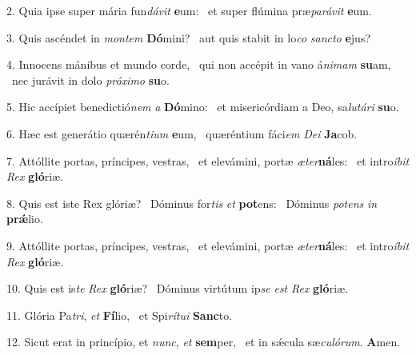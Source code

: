 2. Quia ipse super mária fun\textit{dá}\textit{vit} \textbf{e}um: \ast\  et super flúmina præ\textit{pa}\textit{rá}\textit{vit} \textbf{e}um.\

3. Quis ascéndet in \textit{mon}\textit{tem} \textbf{Dó}mini? \ast\  aut quis stabit in lo\textit{co} \textit{sanc}\textit{to} \textbf{e}jus?\

4. Innocens mánibus et mundo corde, \dag\  qui non accépit in vano á\textit{ni}\textit{mam} \textbf{su}am, \ast\  nec jurávit in dolo \textit{pró}\textit{xi}\textit{mo} \textbf{su}o.\

5. Hic accípiet benedictió\textit{nem} \textit{a} \textbf{Dó}mino: \ast\  et misericórdiam a Deo, sa\textit{lu}\textit{tá}\textit{ri} \textbf{su}o.\

6. Hæc est generátio quærén\textit{ti}\textit{um} \textbf{e}um, \ast\  quæréntium fáci\textit{em} \textit{De}\textit{i} \textbf{Ja}cob.\

7. Attóllite portas, príncipes, vestras, \dag\  et elevámini, portæ \textit{æ}\textit{ter}\textbf{ná}les: \ast\  et intro\textit{í}\textit{bit} \textit{Rex} \textbf{gló}riæ.\

8. Quis est iste Rex glóriæ? \dag\  Dóminus for\textit{tis} \textit{et} \textbf{pot}ens: \ast\  Dóminus \textit{pot}\textit{ens} \textit{in} \textbf{prǽ}lio.\

9. Attóllite portas, príncipes, vestras, \dag\  et elevámini, portæ \textit{æ}\textit{ter}\textbf{ná}les: \ast\  et intro\textit{í}\textit{bit} \textit{Rex} \textbf{gló}riæ.\

10. Quis est is\textit{te} \textit{Rex} \textbf{gló}riæ? \ast\  Dóminus virtútum ip\textit{se} \textit{est} \textit{Rex} \textbf{gló}riæ.\

11. Glória Pa\textit{tri}, \textit{et} \textbf{Fí}lio, \ast\  et Spi\textit{rí}\textit{tu}\textit{i} \textbf{Sanc}to.\

12. Sicut erat in princípio, et \textit{nunc}, \textit{et} \textbf{sem}per, \ast\  et in sǽcula sæ\textit{cu}\textit{ló}\textit{rum}. \textbf{A}men.\

